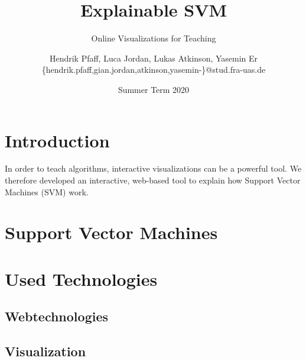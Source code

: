 \documentclass{scrartcl}
\title{Explainable SVM}
\subtitle{Online Visualizations for Teaching}
\author{
  Hendrik Pfaff, Luca Jordan, Lukas Atkinson, Yasemin Er
  \\
  {\normalsize\ttfamily \{hendrik.pfaff,gian.jordan,atkinson,yasemin-\}@stud.fra-uas.de}
}
\date{Summer Term 2020}
\begin{document}
\maketitle

\section{Introduction}

In order to teach algorithms, interactive visualizations can be a powerful tool.
We therefore developed an interactive, web-based tool
to explain how Support Vector Machines (SVM) work.

\section{Support Vector Machines}

\section{Used Technologies}

\subsection{Webtechnologies}

\subsection{Visualization}
\end{document}
